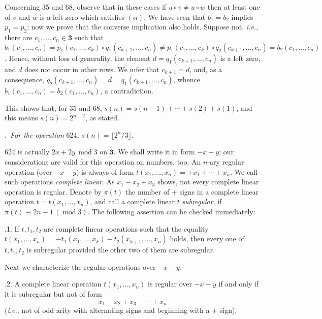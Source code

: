 \documentclass[a4paper,reqno]{amsart}\usepackage{amssymb,latexsym}
\theoremstyle{definition}
\theoremstyle{remark}
\numberwithin{equation}{section}
\numberwithin{theorem}{section}
\begin{document}
Concerning 35 and 68, observe that in these cases if $u\circ v\neq u\circ w$
then at least one of $v$ and $w$ is a left zero which satisfies $\left(
\alpha\right)  $. We have seen that $b_{1}=b_{2}$ implies $p_{1}=p_{2}$; now
we prove that the converse implication also holds. Suppose not, \textit{i.e.},
there are $c_{1},\ldots,c_{n}\in\mathbf{3}$ such that $b_{1}(c_{1},\ldots,c_{n})=p_{1}(c_{1},\ldots,c_{k})\circ q_{1}(c_{k+1},\ldots,c_{n})\neq
p_{1}(c_{1},\ldots,c_{k})\circ q_{2}(c_{k+1},\ldots,c_{n})=b_{2}(c_{1},\ldots,c_{n})$. Hence, without loss of generality, the element $d=q_{1}(c_{k+1},\ldots,c_{n})$ is a left zero, and $d$ does not occur in other rows.
We infer that $c_{k+1}=d$, and, as a consequence, $q_{2}(c_{k+1},\ldots
,c_{n})=d=q_{1}(c_{k+1},\ldots,c_{n})$, whence $b_{1}(c_{1},\ldots
,c_{n})=b_{2}(c_{1},\ldots,c_{n})$, a contradiction.

This shows that, for 35 and 68, $s(n)=s(n-1)+\cdots+s(2)+s(1)$, and this means
$s(n)=2^{n-2}$, as stated.

\bigskip

.\textit{\ For the operation }624\textit{, }$s(n)=\lfloor
2^{n}/3\rfloor$\textit{.}

\smallskip

624 is actually $2x+2y\,\operatorname{mod}3$ on $\mathbf{3}$. We shall write
it in form $-x-y$; our considerations are valid for this operation on numbers,
too. An $n$-ary regular operation (over $-x-y$) is always of form
$t(x_{1},\ldots,x_{n})=\pm x_{1}\pm\cdots\pm x_{n}$. We call such operations
\textit{complete linear}. As $x_{1}-x_{2}+x_{3}$ shows, not every complete
linear operation is regular. Denote by $\pi(t)$ the number of $+$ signs in a
complete linear operation $t=t(x_{1},\ldots,x_{n})$, and call a complete
linear $t$ \textit{subregular}, if $\pi(t)\equiv2n-1\,(\operatorname{mod}3)$.
The following assertion can be checked immediately:

\smallskip

.1. If $t,t_{1},t_{2}$ are complete linear operations such that
the equality $t(x_{1},\ldots,x_{n})=-t_{1}(x_{1},\ldots,x_{k})-t_{2}(x_{k+1},\ldots,x_{n})$ holds, then every one of $t,t_{1},t_{2} $ is
subregular provided the other two of them are subregular.

\smallskip

Next we characterize the regular operations over $-x-y$.

\smallskip

.2. A complete linear operation $t(x_{1},\ldots,x_{n})$ is regular
over $-x-y$ if and only if it is subregular but not of form
\begin{equation}
x_{1}-x_{2}+x_{3}-\cdots+x_{n} \tag{5}\end{equation}
(\textit{i.e.}, not of odd arity with alternating signs and beginning with a
$+$ sign).
\end{document}
